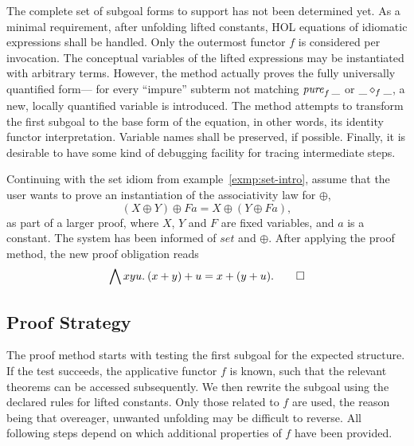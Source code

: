 The complete set of subgoal forms to support has not been determined yet.
\todo{}
As a minimal requirement, after unfolding lifted constants, HOL equations of
idiomatic expressions shall be handled.
Only the outermost functor $f$ is considered per invocation.
The conceptual variables of the lifted expressions may be instantiated with
arbitrary terms.
However, the method actually proves the fully universally quantified form---%
for every ``impure'' subterm not matching $\operatorname{\mathit{pure}}_f{\_}$ or $\_ \diamond_f \_$,
a new, locally quantified variable is introduced.
The method attempts to transform the first subgoal to the base form of the
equation, in other words, its identity functor interpretation.
Variable names shall be preserved, if possible.
Finally, it is desirable to have some kind of debugging facility for tracing
intermediate steps.

\begin{example}\label{exmp:set-usage}
Continuing with the set idiom from example~\ref{exmp:set-intro}, assume that
the user wants to prove an instantiation of the associativity law for $\oplus$,
\[ (X \oplus Y) \oplus F a = X \oplus (Y \oplus F a), \]
as part of a larger proof, where $X$, $Y$ and $F$ are fixed variables, and
$a$ is a constant.
The system has been informed of $\mathit{set}$ and $\oplus$.
After applying the proof method, the new proof obligation reads
\[ \bigwedge x y u.\>(x + y) + u = x + (y + u). \qedhere \]
\end{example}

\subsection{Proof Strategy}\label{subsec:proof-strategy}

The proof method starts with testing the first subgoal for the expected
structure.
If the test succeeds, the applicative functor $f$ is known, such that the
relevant theorems can be accessed subsequently.
We then rewrite the subgoal using the declared rules for lifted constants.
Only those related to $f$ are used, the reason being that overeager, unwanted
unfolding may be difficult to reverse.
All following steps depend on which additional properties of $f$ have been
provided.

